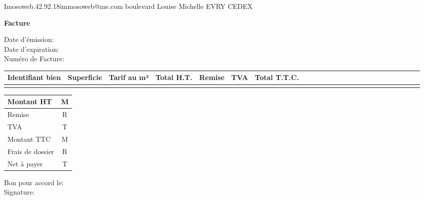\documentclass{article}
\begin{document}
\begin{raggedleft}
\newline Imosoweb.42.92.18\newline immosoweb@me.com boulevard Louise Michelle EVRY CEDEX
\end{raggedleft}

\begin{flushright}
\nomclient \prenom
\numeroclient
\emailclient
\adresseclient
\codecopstaleclient
\villeclient

\end{flushright}

\begin{center}
\president
\textbf{ \huge{Facture}}
\end{center}
\vspace{0.5cm}
\begin{flushleft}
Date d'émission:
\\Date d'expiration:
\\Numéro de Facture:
\end{flushleft}

\vspace { 1cm } 
\begin{center}
\begin{tabular}{|p{3cm}|p{2cm}|p{2cm}|p{2cm}|p{2cm}|p{2cm}|p{2cm}|}
\hline
Identifiant bien & Superficie & Tarif au m² & Total H.T. &Remise &TVA & Total T.T.C.  \\
\hline
& & & & 
& & & &
& & & &
& & & & 
& & & & 
& & & & \\
\hline
\end{tabular}
\end{center}

\begin{flushright}
\begin{tabular}{|p{4cm} c|}
\hline
Montant HT & M \\
\hline
Remise & R \\
\hline
TVA & T \\
\hline
Montant TTC & M \\
\hline
Frais de dossier & R \\
\hline
Net à payer & T \\
\hline
\end{tabular}
\end{flushright}

\vspace{1cm}
\begin{flushleft}
Bon pour accord le:
\\Signature:
\end{flushleft}
\end{document}

